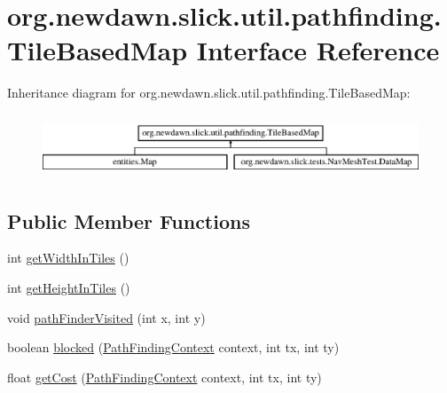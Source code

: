 \hypertarget{interfaceorg_1_1newdawn_1_1slick_1_1util_1_1pathfinding_1_1_tile_based_map}{}\section{org.\+newdawn.\+slick.\+util.\+pathfinding.\+Tile\+Based\+Map Interface Reference}
\label{interfaceorg_1_1newdawn_1_1slick_1_1util_1_1pathfinding_1_1_tile_based_map}
Inheritance diagram for org.\+newdawn.\+slick.\+util.\+pathfinding.\+Tile\+Based\+Map\+:\begin{figure}[H]
\begin{center}
\leavevmode
\includegraphics[height=1.898305cm]{interfaceorg_1_1newdawn_1_1slick_1_1util_1_1pathfinding_1_1_tile_based_map}
\end{center}
\end{figure}
\subsection*{Public Member Functions}
\begin{DoxyCompactItemize}
\item 
int \mbox{\hyperlink{interfaceorg_1_1newdawn_1_1slick_1_1util_1_1pathfinding_1_1_tile_based_map_a5efac540b233405c4ae65b784a7c6d22}{get\+Width\+In\+Tiles}} ()
\item 
int \mbox{\hyperlink{interfaceorg_1_1newdawn_1_1slick_1_1util_1_1pathfinding_1_1_tile_based_map_a9669f3dafa1ce48a20e3d7d8c1de239a}{get\+Height\+In\+Tiles}} ()
\item 
void \mbox{\hyperlink{interfaceorg_1_1newdawn_1_1slick_1_1util_1_1pathfinding_1_1_tile_based_map_aeb1c1b5cbb0aecc4e280dbe18d5af5ac}{path\+Finder\+Visited}} (int x, int y)
\item 
boolean \mbox{\hyperlink{interfaceorg_1_1newdawn_1_1slick_1_1util_1_1pathfinding_1_1_tile_based_map_af01ba12d90f794cd16138e05dc328725}{blocked}} (\mbox{\hyperlink{interfaceorg_1_1newdawn_1_1slick_1_1util_1_1pathfinding_1_1_path_finding_context}{Path\+Finding\+Context}} context, int tx, int ty)
\item 
float \mbox{\hyperlink{interfaceorg_1_1newdawn_1_1slick_1_1util_1_1pathfinding_1_1_tile_based_map_ad2e68a8e3405c15b90b5247ffb70897f}{get\+Cost}} (\mbox{\hyperlink{interfaceorg_1_1newdawn_1_1slick_1_1util_1_1pathfinding_1_1_path_finding_context}{Path\+Finding\+Context}} context, int tx, int ty)
\end{DoxyCompactItemize}


